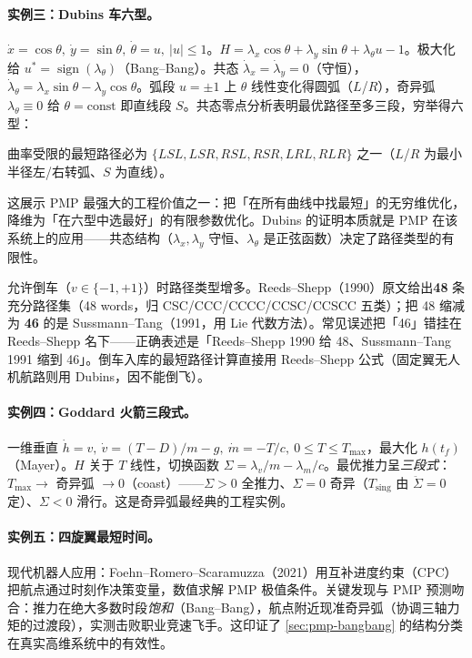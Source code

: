 \paragraph{实例三：Dubins 车六型。}
$\dot x=\cos\theta,\ \dot y=\sin\theta,\ \dot\theta=u,\ |u|\le1$。$H=\lambda_x\cos\theta+\lambda_y\sin\theta+\lambda_\theta u-1$。极大化给 $u^\ast=\operatorname{sign}(\lambda_\theta)$（Bang--Bang）。共态 $\dot\lambda_x=\dot\lambda_y=0$（守恒），$\dot\lambda_\theta=\lambda_x\sin\theta-\lambda_y\cos\theta$。弧段 $u=\pm1$ 上 $\theta$ 线性变化得圆弧（$L$/$R$），奇异弧 $\lambda_\theta\equiv0$ 给 $\theta=\text{const}$ 即直线段 $S$。共态零点分析表明最优路径至多三段，穷举得六型：

\begin{theorem}[Dubins 定理]\label{thm:pmp-dubins}
曲率受限的最短路径必为 $\{LSL,LSR,RSL,RSR,LRL,RLR\}$ 之一（$L$/$R$ 为最小半径左/右转弧、$S$ 为直线）\cite{dubins1957curves}。
\end{theorem}

这展示 PMP 最强大的工程价值之一：把「在所有曲线中找最短」的无穷维优化，降维为「在六型中选最好」的有限参数优化。Dubins 的证明本质就是 PMP 在该系统上的应用——共态结构（$\lambda_x,\lambda_y$ 守恒、$\lambda_\theta$ 是正弦函数）决定了路径类型的有限性。

\begin{note}
允许倒车（$v\in\{-1,+1\}$）时路径类型增多。Reeds--Shepp（1990）原文给出\textbf{48} 条充分路径集（48 words，归 CSC/CCC/CCCC/CCSC/CCSCC 五类）\cite{reeds1990optimal}；把 48 缩减为 \textbf{46} 的是 Sussmann--Tang（1991，用 Lie 代数方法）\cite{sussmann1991shortest}。常见误述把「46」错挂在 Reeds--Shepp 名下——正确表述是「Reeds--Shepp 1990 给 48、Sussmann--Tang 1991 缩到 46」。倒车入库的最短路径计算直接用 Reeds--Shepp 公式（固定翼无人机航路则用 Dubins，因不能倒飞）。
\end{note}

\paragraph{实例四：Goddard 火箭三段式。}
一维垂直 $\dot h=v,\ \dot v=(T-D)/m-g,\ \dot m=-T/c,\ 0\le T\le T_{\max}$，最大化 $h(t_f)$（Mayer）。$H$ 关于 $T$ 线性，切换函数 $\Sigma=\lambda_v/m-\lambda_m/c$。最优推力呈\emph{三段式}：$T_{\max}\to$ 奇异弧 $\to0$（coast）——$\Sigma>0$ 全推力、$\Sigma=0$ 奇异（$T_{\mathrm{sing}}$ 由 $\ddot\Sigma=0$ 定）、$\Sigma<0$ 滑行\cite{bonnans2008singular}。这是奇异弧最经典的工程实例。

\paragraph{实例五：四旋翼最短时间。}
现代机器人应用：Foehn--Romero--Scaramuzza（2021）用互补进度约束（CPC）把航点通过时刻作决策变量，数值求解 PMP 极值条件\cite{foehn2021cpc}。关键发现与 PMP 预测吻合：推力在绝大多数时段\emph{饱和}（Bang--Bang），航点附近现准奇异弧（协调三轴力矩的过渡段），实测击败职业竞速飞手。这印证了 \cref{sec:pmp-bangbang} 的结构分类在真实高维系统中的有效性。

